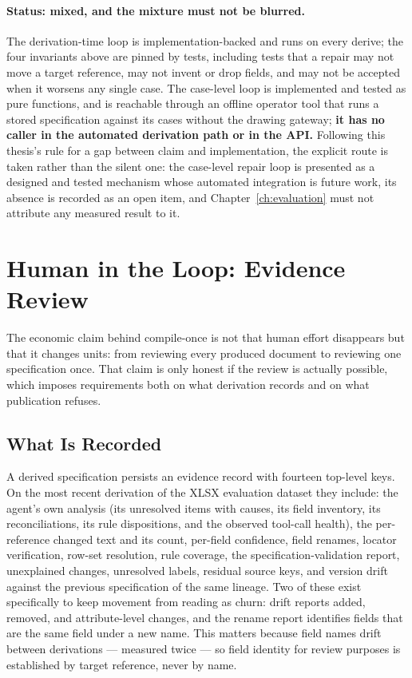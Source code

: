 \paragraph{Status: mixed, and the mixture must not be blurred.}
The derivation-time loop is implementation-backed and runs on every derive; the four invariants above
are pinned by tests, including tests that a repair may not move a target reference, may not invent or
drop fields, and may not be accepted when it worsens any single case. The case-level loop is
implemented and tested as pure functions, and is reachable through an offline operator tool that runs
a stored specification against its cases without the drawing gateway; \textbf{it has no caller in the
automated derivation path or in the API.} Following this thesis's rule for a gap between claim and
implementation, the explicit route is taken rather than the silent one: the case-level repair loop is
presented as a designed and tested mechanism whose automated integration is future work, its absence
is recorded as an open item, and Chapter~\ref{ch:evaluation} must not attribute any measured result to
it.

\section{Human in the Loop: Evidence Review}
\label{sec:der:evidence}

The economic claim behind compile-once is not that human effort disappears but that it changes units:
from reviewing every produced document to reviewing one specification once. That claim is only honest
if the review is actually possible, which imposes requirements both on what derivation records and on
what publication refuses.

\subsection{What Is Recorded}

A derived specification persists an evidence record with fourteen top-level keys. On the most recent
derivation of the XLSX evaluation dataset they include: the agent's own analysis (its unresolved items
with causes, its field inventory, its reconciliations, its rule dispositions, and the observed tool-call
health), the per-reference changed text and its count, per-field confidence, field renames, locator
verification, row-set resolution, rule coverage, the specification-validation report, unexplained
changes, unresolved labels, residual source keys, and version drift against the previous specification
of the same lineage. Two of
these exist specifically to keep movement from reading as churn: drift reports added, removed, and
attribute-level changes, and the rename report identifies fields that are the same field under a new
name. This matters because field names drift between derivations --- measured twice --- so field
identity for review purposes is established by target reference, never by name.

